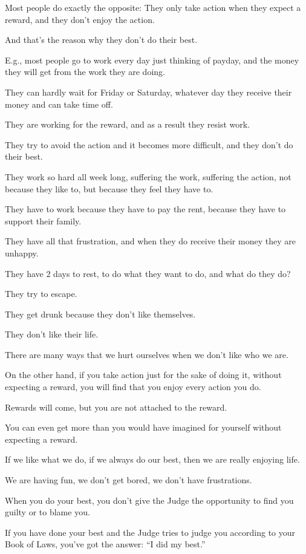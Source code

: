 \documentclass{article}
\numberwithin{equation}{section}
\begin{document}
Most people do exactly the opposite: They only take action when they expect a reward, and they don't enjoy the action.

And that's the reason why they don't do their best.

%
E.g., most people go to work every day just thinking of payday, and the money they will get from the work they are doing.

They can hardly wait for Friday or Saturday, whatever day they receive their money and can take time off.

They are working for the reward, and as a result they resist work.

They try to avoid the action and it becomes more difficult, and they don't do their best.

%
They work so hard all week long, suffering the work, suffering the action, not because they like to, but because they feel they have to.

They have to work because they have to pay the rent, because they have to support their family.

They have all that frustration, and when they do receive their money they are unhappy.

They have 2 days to rest, to do what they want to do, and what do they do?

They try to escape.

They get drunk because they don't like themselves.

They don't like their life.

There are many ways that we hurt ourselves when we don't like who we are.

%
On the other hand, if you take action just for the sake of doing it, without expecting a reward, you will find that you enjoy every action you do.

Rewards will come, but you are not attached to the reward.

You can even get more than you would have imagined for yourself without expecting a reward.

If we like what we do, if we always do our best, then we are really enjoying life.

We are having fun, we don't get bored, we don't have frustrations.

%
When you do your best, you don't give the Judge the opportunity to find you guilty or to blame you.

If you have done your best and the Judge tries to judge you according to your Book of Laws, you've got the answer: ``I did my best.''
\end{document}
